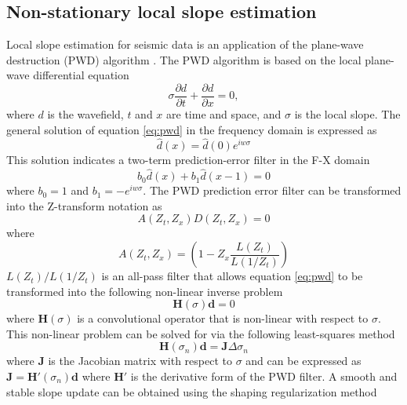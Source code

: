 \subsection{Non-stationary local slope estimation}
Local slope estimation for seismic data is an application of the plane-wave destruction (PWD) algorithm \cite[]{fomel2002}. 
The PWD algorithm is based on the local plane-wave differential equation
\begin{equation}
\sigma\frac{\partial d}{\partial t}+\frac{\partial d}{\partial x}=0,
\label{eq:pwd}
\end{equation}
where $d$ is the wavefield, $t$ and $x$ are time and space, and $\sigma$ is the local slope. The general solution of equation \ref{eq:pwd} in the frequency domain is expressed as 
\begin{equation}
\hat{d}(x)=\hat{d}(0)e^{iw\sigma}
\label{eq:pwdfsol}
\end{equation}
This solution indicates a two-term prediction-error filter in the F-X domain
\begin{equation}
b_0\hat{d}(x)+b_1\hat{d}(x-1)=0
\label{eq:pwdfsolpef}
\end{equation}
where $b_0=1$ and $b_1=-e^{iw\sigma}$. 
The PWD prediction error filter can be transformed into the Z-transform notation as 
\begin{equation}
A(Z_t,Z_x)D(Z_t,Z_x)=0
\label{eq:pwdz}
\end{equation}
where 
\begin{equation}
A(Z_t,Z_x)=(1-Z_x\frac{L(Z_t)}{L(1/Z_t)})
\label{eq:pwdz}
\end{equation}
$L(Z_t)/L(1/Z_t)$ is an all-pass filter that allows equation \ref{eq:pwd} to be transformed into the following non-linear inverse problem
\begin{equation}
\mathbf{H}(\sigma)\mathbf{d}=0
\label{eq:slopegn}
\end{equation}
where $\mathbf{H}(\sigma)$ is a convolutional operator that is non-linear with respect to $\sigma$. This non-linear problem can be solved for via the following least-squares method
\begin{equation}
\mathbf{H}(\sigma_n)\mathbf{d}=\mathbf{J}\Delta\sigma_n
\label{eq:slopegn}
\end{equation}
where $\mathbf{J}$ is the Jacobian matrix with respect to $\sigma$ and can be expressed as $\mathbf{J}=\mathbf{H}'(\sigma_n)\mathbf{d}$ where $\mathbf{H}'$ is the derivative form of the PWD filter. A smooth and stable slope update can be obtained using the shaping regularization method
